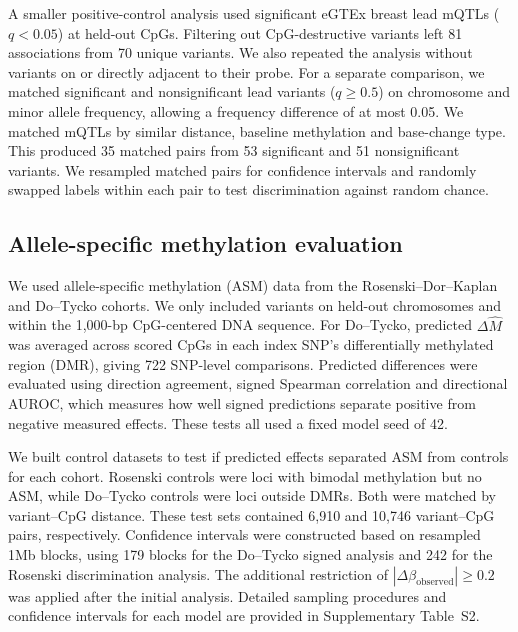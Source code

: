 \documentclass[11pt,letterpaper]{article}
\begin{document}
A smaller positive-control analysis used significant eGTEx breast lead mQTLs ($q<0.05$) at held-out CpGs. Filtering out CpG-destructive variants left 81 associations from 70 unique variants. We also repeated the analysis without variants on or directly adjacent to their probe. For a separate comparison, we matched significant and nonsignificant lead variants ($q\geq0.5$) on chromosome and minor allele frequency, allowing a frequency difference of at most 0.05. We matched mQTLs by similar distance, baseline methylation and base-change type. This produced 35 matched pairs from 53 significant and 51 nonsignificant variants. We resampled matched pairs for confidence intervals and randomly swapped labels within each pair to test discrimination against random chance.

\subsection{Allele-specific methylation evaluation}
We used allele-specific methylation (ASM) data from the Rosenski--Dor--Kaplan \cite{rosenski2025asm} and Do--Tycko \cite{do2020asm} cohorts. We only included variants on held-out chromosomes and within the 1,000-bp CpG-centered DNA sequence. For Do--Tycko, predicted $\Delta\widehat M$ was averaged across scored CpGs in each index SNP's differentially methylated region (DMR), giving 722 SNP-level comparisons. Predicted differences were evaluated using direction agreement, signed Spearman correlation and directional AUROC, which measures how well signed predictions separate positive from negative measured effects. These tests all used a fixed model seed of 42. 

We built control datasets to test if predicted effects separated ASM from controls for each cohort. Rosenski controls were loci with bimodal methylation but no ASM, while Do--Tycko controls were loci outside DMRs. Both were matched by variant--CpG distance. These test sets contained 6,910 and 10,746 variant--CpG pairs, respectively. Confidence intervals were constructed based on resampled 1Mb blocks, using 179 blocks for the Do--Tycko signed analysis and 242 for the Rosenski discrimination analysis. The additional restriction of $|\Delta\beta_{\mathrm{observed}}|\geq0.2$ was applied after the initial analysis. Detailed sampling procedures and confidence intervals for each model are provided in Supplementary Table~S2.
\end{document}
